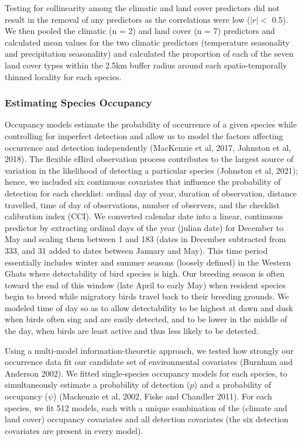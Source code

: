 Testing for collinearity among the climatic and land cover predictors did not result in the removal of any predictors as the correlations were low ($|r| <$ 0.5).
We then pooled the climatic (n = 2) and land cover (n = 7) predictors and calculated mean values for the two climatic predictors (temperature seasonality and precipitation seasonality) and calculated the proportion of each of the seven land cover types within the 2.5km buffer radius around each spatio-temporally thinned locality for each species.

\subsubsection*{Estimating Species Occupancy}

Occupancy models estimate the probability of occurrence of a given species while controlling for imperfect detection and allow us to model the factors affecting occurrence and detection independently (MacKenzie et al, 2017, Johnston et al, 2018).
The flexible eBird observation process contributes to the largest source of variation in the likelihood of detecting a particular species (Johnston et al, 2021); hence, we included six continuous covariates that influence the probability of detection for each checklist: ordinal day of year, duration of observation, distance travelled, time of day of observations, number of observers, and the checklist calibration index (CCI).
We converted calendar date into a linear, continuous predictor by extracting ordinal days of the year (julian date) for December to May and scaling them between 1 and 183 (dates in December subtracted from 333, and 31 added to dates between January and May).
This time period essentially includes winter and summer seasons (loosely defined) in the Western Ghats where detectability of bird species is high.
Our breeding season is often toward the end of this window (late April to early May) when resident species begin to breed while migratory birds travel back to their breeding grounds.
We modeled time of day so as to allow detectability to be highest at dawn and dusk when birds often sing and are easily detected, and to be lower in the middle of the day, when birds are least active and thus less likely to be detected.

Using a multi-model information-theoretic approach, we tested how strongly our occurrence data fit our candidate set of environmental covariates (Burnham and Anderson 2002).
We fitted single-species occupancy models for each species, to simultaneously estimate a probability of detection ($p$) and a probability of occupancy ($\psi$) (Mackenzie et al, 2002, Fiske and Chandler 2011).
For each species, we fit 512 models, each with a unique combination of the (climate and land cover) occupancy covariates and all detection covariates (the six detection covariates are present in every model).

